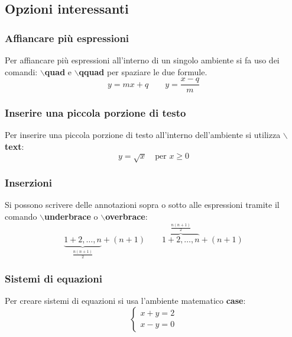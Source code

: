 \documentclass[a4paper, 12pt]{book}
\theoremstyle{plain}
\begin{document}
	\subsection{Opzioni interessanti}
	\subsubsection{Affiancare più espressioni}
	Per affiancare più espressioni all'interno di un singolo ambiente si fa uso dei comandi: \textbf{$\backslash$quad} e \textbf{$\backslash$qquad} per spaziare le due formule.
	\[
	y = mx + q\qquad y = \frac{x - q}{m}
	\]
	\subsubsection{Inserire una piccola porzione di testo}
	Per inserire una piccola porzione di testo all'interno dell'ambiente si utilizza \textbf{$\backslash$text}:
	\[
	y = \sqrt{x} \quad\textrm{per $x\geq 0$}
	\]
	
	\subsubsection{Inserzioni}
	Si possono scrivere delle annotazioni sopra o sotto alle espressioni tramite il comando \textbf{$\backslash$underbrace} o \textbf{$\backslash$overbrace}:
	\[
	\underbrace{1 + 2, \dots, n}_{\frac{n(n + 1)}{2}} + (n + 1)\qquad \overbrace{1 + 2, \dots, n}^{\frac{n(n + 1)}{2}} + (n + 1)
	\]
	
	\subsubsection{Sistemi di equazioni}
	Per creare sistemi di equazioni si usa l'ambiente matematico \textbf{case}:
	\[
	\begin{cases}
		x + y = 2\\
		x - y = 0
	\end{cases}
	\]
	
\end{document}
